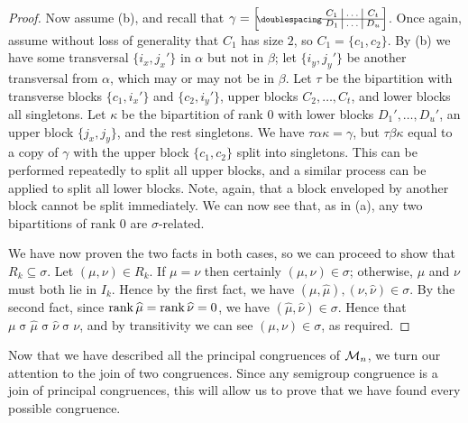 \begin{lemma}
\begin{proof}
    Now assume (b), and recall that
    $\gamma = \bipart{c|c|c}{1-3}{C_1 & \ldots & C_t}{D_1 & \ldots & D_u}$.
    Once again, assume without loss of generality that $C_1$ has size $2$, so
    $C_1 = \{c_1, c_2\}$.  By (b) we have some transversal $\{i_x, j_x'\}$ in
    $\alpha$ but not in $\beta$; let $\{i_y, j_y'\}$ be another transversal from
    $\alpha$, which may or may not be in $\beta$.  Let $\tau$ be the bipartition
    with transverse blocks $\{c_1, i_x'\}$ and $\{c_2, i_y'\}$, upper blocks
    $C_2, \ldots, C_t$, and lower blocks all singletons.  Let $\kappa$ be the
    bipartition of rank $0$ with lower blocks $D_1', \ldots, D_u'$, an upper
    block $\{j_x, j_y\}$, and the rest singletons.  We have
    $\tau\alpha\kappa = \gamma$, but $\tau\beta\kappa$ equal to a copy of
    $\gamma$ with the upper block $\{c_1, c_2\}$ split into singletons.  This
    can be performed repeatedly to split all upper blocks, and a similar process
    can be applied to split all lower blocks.  Note, again, that a block
    enveloped by another block cannot be split immediately.  We can now see
    that, as in (a), any two bipartitions of rank $0$ are $\sigma$-related.

    We have now proven the two facts in both cases, so we can proceed to show
    that $R_k \subseteq \sigma$.  Let $(\mu, \nu) \in R_k$.  If $\mu=\nu$ then
    certainly $(\mu, \nu) \in \sigma$; otherwise, $\mu$ and $\nu$ must both lie
    in $I_k$.  Hence by the first fact, we have
    $(\mu, \widehat\mu), (\nu, \widehat\nu) \in \sigma$.  By the second fact,
    since $\operatorname{rank}\widehat\mu = \operatorname{rank}\widehat\nu = 0$, we have
    $(\widehat\mu, \widehat\nu) \in \sigma$.  Hence that
    $\mu \mathrel\sigma \widehat\mu \mathrel\sigma \widehat\nu \mathrel\sigma
    \nu$, and by transitivity we can see $(\mu, \nu) \in \sigma$, as required.
  \end{proof}
\end{lemma}

Now that we have described all the principal congruences of $\mathcal{M}_n$, we turn
our attention to the join of two congruences.  Since any semigroup congruence is
a join of principal congruences, this will allow us to prove that we have found
every possible congruence.

